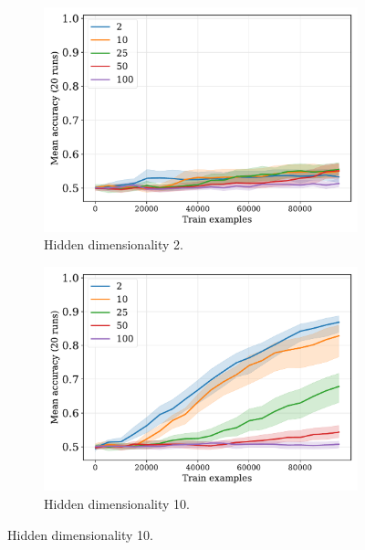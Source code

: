 \begin{figure}[H]
  \centering

  \begin{subfigure}{0.45\linewidth}
    \includegraphics[width=1\textwidth]{../fig/flatpremack-h1-train_size-embed_dim-hidden_dim=2.pdf}
    \caption{Hidden dimensionality 2.}
  \end{subfigure}
  \hfill
  \begin{subfigure}{0.45\linewidth}
    \includegraphics[width=1\textwidth]{../fig/flatpremack-h1-train_size-embed_dim-hidden_dim=10.pdf}
    \caption{Hidden dimensionality 10.}
  \end{subfigure}

  \vspace{24pt}


\end{figure}
